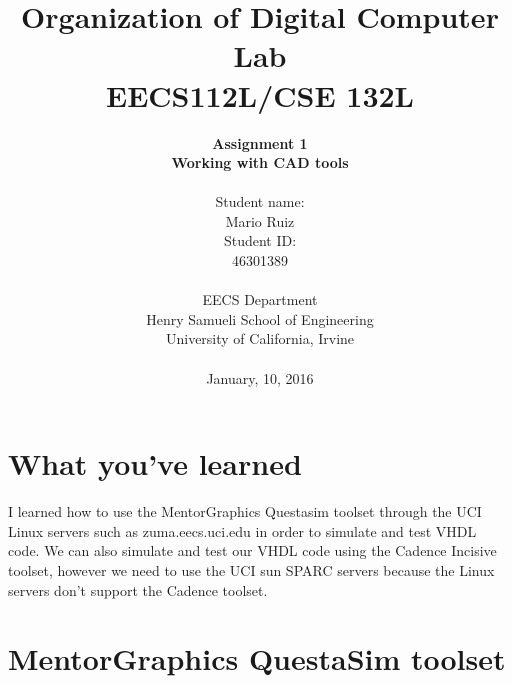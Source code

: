 \documentclass{article}
\begin{document}
\title{Organization of Digital Computer Lab \\ EECS112L/CSE 132L}
\author{\textbf{Assignment 1 }\\ \textbf{Working with CAD tools} \\ \\
Student name: \\ Mario Ruiz \\Student ID: \\46301389 \\ \\ 
EECS Department\\ Henry Samueli School of Engineering \\ University of California, Irvine \\ \\
{January, 10, 2016}} 


\date{}
\maketitle


\section{What you've learned}
	I learned how to use the MentorGraphics Questasim toolset through the UCI Linux servers such as zuma.eecs.uci.edu in order to simulate and test VHDL code. We can also simulate and test our VHDL code using the Cadence Incisive toolset, however we need to use the UCI sun SPARC servers because the Linux servers don't support the Cadence toolset. 
	
	\section{MentorGraphics QuestaSim toolset}
 
\end{document}
